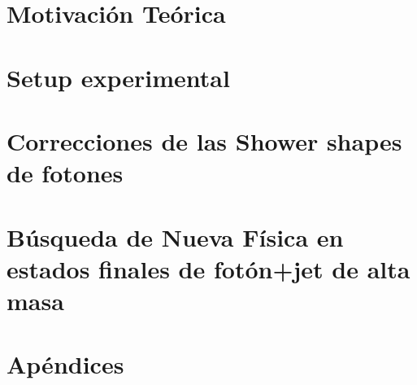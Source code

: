 \documentclass[a4paper,11pt,oneside,spanish]{memoir}
\begin{document}
\acresetall

\acresetall


\part{Motivación Teórica}
\label{part:theory}



\FloatBarrier
\part{Setup experimental}
\label{part:exp_setup}




\FloatBarrier
\part{Correcciones de las Shower shapes de fotones}
\label{part:pid}




\FloatBarrier
\part{B\'usqueda de Nueva Física en estados finales de fotón+jet de alta masa}
\label{part:search}








\FloatBarrier



















\appendix
\part*{Apéndices}


\end{document}

